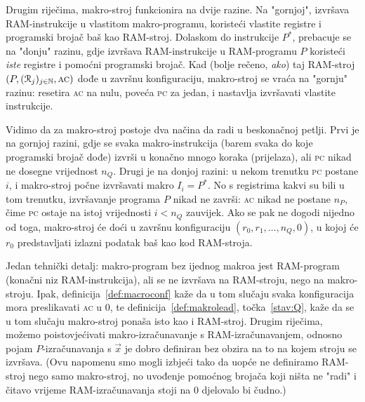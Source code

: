 Drugim riječima, makro-stroj funkcionira na dvije razine. Na "gornjoj", izvršava RAM-instrukcije u vlastitom makro-programu, koristeći vlastite registre i programski brojač baš kao RAM-stroj. Dolaskom do instrukcije $P^*$, prebacuje se na "donju" razinu, gdje izvršava RAM-instrukcije u RAM-programu $P$ koristeći \emph{iste} registre i pomoćni programski brojač. Kad (bolje rečeno, \emph{ako}) taj RAM-stroj $(P,(\mathcal R_{j})_{j\in{\mathbb N}},\textsc{ac})$ dođe u završnu konfiguraciju, makro-stroj se vraća na "gornju" razinu: resetira \textsc{ac} na nulu, poveća \textsc{pc} za jedan, i nastavlja izvršavati vlastite instrukcije.

Vidimo da za makro-stroj postoje dva načina da radi u beskonačnoj petlji. Prvi je na gornjoj razini, gdje se svaka makro-instrukcija (barem svaka do koje programski brojač dođe) izvrši u konačno mnogo koraka (prijelaza), ali \textsc{pc} nikad ne dosegne vrijednost $n_Q$. Drugi je na donjoj razini: u nekom trenutku \textsc{pc} postane $i$, i makro-stroj počne izvršavati makro $I_i=P^*$. No s registrima kakvi su bili u tom trenutku, izvršavanje programa $P$ nikad ne završi: \textsc{ac} nikad ne postane $n_P$, čime \textsc{pc} ostaje na istoj vrijednosti $i<n_Q$ zauvijek. Ako se pak ne dogodi nijedno od toga, makro-stroj će doći u završnu konfiguraciju $(r_0,r_1,\dotsc,n_Q,0)$, u kojoj će $r_0$ predstavljati izlazni podatak baš kao kod RAM-stroja.

\begin{napomena}\label{nap:rem}
Jedan tehnički detalj: makro-program bez ijednog makroa jest RAM-program (konačni niz RAM-instrukcija), ali se ne izvršava na RAM-stroju, nego na makro-stroju. Ipak, definicija~\ref{def:macroconf} kaže da u tom slučaju svaka konfiguracija mora preslikavati \textsc{ac} u $0$, te definicija~\ref{def:makrolead}, točka~\ref{stav:Q}, kaže da se u tom slučaju makro-stroj ponaša isto kao i RAM-stroj. Drugim riječima, možemo poistovjećivati makro-izračunavanje s RAM-izračunavanjem, odnosno pojam $P$-izračunavanja s $\vec x$ je dobro definiran bez obzira na to na kojem stroju se izvršava. (Ovu napomenu smo mogli izbjeći tako da uopće ne definiramo RAM-stroj nego samo makro-stroj, no uvođenje pomoćnog brojača koji ništa ne "radi" i čitavo vrijeme RAM-izračunavanja stoji na $0$ djelovalo bi čudno.)
\end{napomena}

